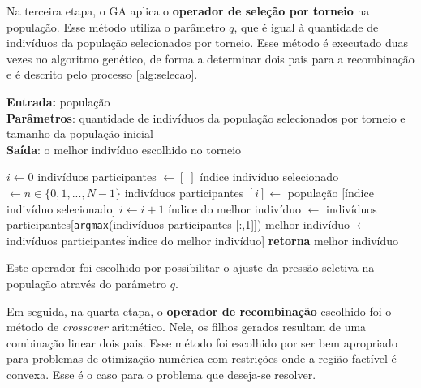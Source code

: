 \documentclass[a4paper, 12pt]{article}
\newenvironment{brprocess}[1][]
  {\begin{algorithm}[#1]
     \selectlanguage{brazilian}%
     \floatname{algorithm}{Processo}%
     \renewcommand{\algorithmicif}{\textbf{se}}%
     \renewcommand{\algorithmicfor}{\textbf{para}}%
     \renewcommand{\algorithmicdo}{\textbf{faça}}%
     \renewcommand{\algorithmicthen}{\textbf{faça}}%
     \renewcommand{\algorithmicend}{\textbf{fim}}%
     \renewcommand{\algorithmicwhile}{\textbf{enquanto}}%
     \renewcommand{\algorithmicelse}{\textbf{caso contrário}}%
  }
  {\end{algorithm}}
\begin{document}
Na terceira etapa, o GA aplica o \textbf{operador de seleção por torneio} na população. Esse método utiliza o parâmetro $q$, que é igual à quantidade de indivíduos da população selecionados por torneio. Esse método é executado duas vezes no algoritmo genético, de forma a determinar dois pais para a recombinação e é descrito pelo processo \ref{alg:selecao}.
\begin{brprocess}[!ht]
    \cprotect\caption{Operador de seleção por torneio (\verb|selecao_torneio(populacao,|
    \verb|N, q_torneio)|}
    \textbf{Entrada:} população\\
    \textbf{Parâmetros}: quantidade de indivíduos da população selecionados por torneio e tamanho da população inicial\\
    \textbf{Saída}: o melhor indivíduo escolhido no torneio
    \begin{algorithmic}
            \State $i \gets 0$
            \State indivíduos participantes $\gets [\;]$
                \State índice indivíduo selecionado $\gets n \in \{0, 1, ..., N - 1\}$
                \State indivíduos participantes $[i] \gets$ população [índice indivíduo selecionado]
                \State $i \gets i + 1$
            \EndWhile
            \State índice do melhor indivíduo $\gets$ indivíduos participantes[\verb|argmax|(indivíduos participantes [:,1]])
            \State melhor indivíduo $\gets$ indivíduos participantes[índice do melhor indivíduo]
            \State \textbf{retorna} melhor indivíduo
    \end{algorithmic}
    \label{alg:selecao}
\end{brprocess}

Este operador foi escolhido por possibilitar o ajuste da pressão seletiva na população através do parâmetro $q$.

Em seguida, na quarta etapa, o \textbf{operador de recombinação} escolhido foi o método de \textit{crossover} aritmético. Nele, os filhos gerados resultam de uma combinação linear dois pais. Esse método foi escolhido por ser bem apropriado para problemas de otimização numérica com restrições onde a região factível é convexa. Esse é o caso para o problema que deseja-se resolver.
\end{document}
